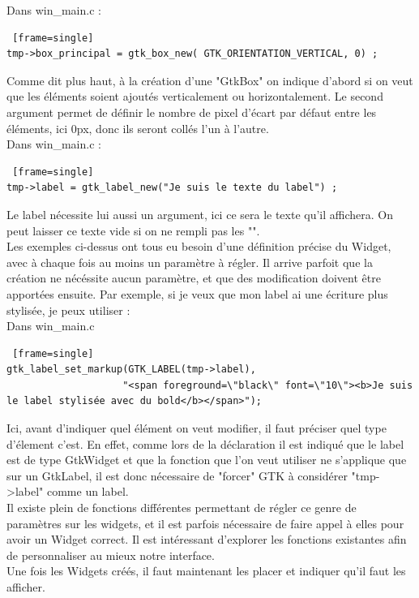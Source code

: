 \documentclass[11pt,french,a4paper]{report}
\begin{document}
\small Dans win\_main.c :
\begin{lstlisting} [frame=single]
tmp->box_principal = gtk_box_new( GTK_ORIENTATION_VERTICAL, 0) ;
\end{lstlisting}
Comme dit plus haut, à la création d'une "GtkBox" on indique d'abord si on veut que les éléments soient ajoutés verticalement 
ou horizontalement. Le second argument permet de définir le nombre de pixel d'écart par défaut entre les éléments, 
ici 0px, donc ils seront collés l'un à l'autre.  \\

\small Dans win\_main.c :
\begin{lstlisting} [frame=single]
tmp->label = gtk_label_new("Je suis le texte du label") ; 
\end{lstlisting}
Le label nécessite lui aussi un argument, ici ce sera le texte qu'il affichera. 
On peut laisser ce texte vide si on ne rempli pas les "".  \\


Les exemples ci-dessus ont tous eu besoin d'une définition précise du Widget, avec à chaque fois au moins un paramètre à régler. 
Il arrive parfoit que la création ne nécéssite aucun paramètre, et que des modification doivent être apportées ensuite. 
Par exemple, si je veux que mon label ai une écriture plus stylisée, je peux utiliser :  \\
\small Dans win\_main.c
\begin{lstlisting} [frame=single]
gtk_label_set_markup(GTK_LABEL(tmp->label), 
                    "<span foreground=\"black\" font=\"10\"><b>Je suis le label stylisée avec du bold</b></span>"); 
\end{lstlisting}
Ici, avant d'indiquer quel élément on veut modifier, il faut préciser quel type d'élement c'est.
En effet, comme lors de la déclaration il est indiqué que le label est de type GtkWidget et que la fonction que l'on veut utiliser 
ne s'applique que sur un GtkLabel, il est donc nécessaire de "forcer" GTK à considérer "tmp->label" comme un label.\\

Il existe plein de fonctions différentes permettant de régler ce genre de paramètres sur les widgets, et il est parfois nécessaire 
de faire appel à elles pour avoir un Widget correct. 
Il est intéressant d'explorer les fonctions existantes afin de personnaliser au mieux notre interface. \\
Une fois les Widgets créés, il faut maintenant les placer et indiquer qu'il faut les afficher. \\ 
\end{document}
